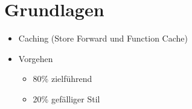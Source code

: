 \chapter{Grundlagen}
\label{cha:grundlagen}

\begin{itemize}
\item Caching (Store Forward und Function Cache)
\item Vorgehen
\begin{itemize}
\item 80\% zielführend
\item 20\% gefälliger Stil
\end{itemize}

\end{itemize}
